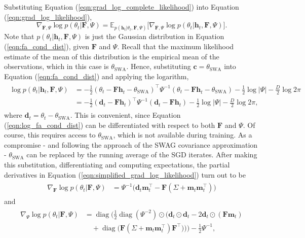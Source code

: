 \documentclass[msc,deptreport.inf]{infthesis} %
\newcommand{\matr}[1]{\mathbf{#1}}
\newcommand{\E}{\mathbb E}
\newcommand{\diag}{\mathop{\mathrm{diag}}}
\begin{document}
Substituting Equation (\ref{eqn:grad_log_complete_likelihood}) into Equation (\ref{eqn:grad_log_likelihood}),
\begin{equation}\label{eqn:simplified_grad_log_likelihood}
	\nabla_{\matr{F}, \Psi} \log p(\theta_t | \matr{F}, \Psi)
	= \E_{p(\matr{h}_t | \theta_t, \matr{F}, \Psi)} \big[ \nabla_{\matr{F}, \Psi} \log p(\theta_t | \matr{h}_t, \matr{F}, \Psi) \big].
\end{equation}
Note that $p(\theta_t | \matr{h}_t, \matr{F}, \Psi)$ is just the Gaussian distribution in Equation (\ref{eqn:fa_cond_dist}), given $\matr{F}$ and $\Psi$. Recall that the maximum likelihood estimate of the mean of this distribution is the empirical mean of the observations, which in this case is $\theta_{\text{SWA}}$. Hence, substituting $\matr{c} = \theta_{\text{SWA}}$ into Equation (\ref{eqn:fa_cond_dist}) and applying the logarithm,
\begin{align}\label{eqn:log_fa_cond_dist}
\begin{split}
	\log p(\theta_t | \matr{h}_t, \matr{F}, \Psi)
	& = -\frac{1}{2} (\theta_t - \matr{Fh}_t - \theta_{\text{SWA}})^\intercal \Psi^{-1} (\theta_t - \matr{Fh}_t - \theta_{\text{SWA}}) - \frac{1}{2} \log |\Psi| - \frac{D}{2} \log 2\pi \\
	& = -\frac{1}{2} (\matr{d}_t - \matr{Fh}_t)^\intercal \Psi^{-1} (\matr{d}_t - \matr{Fh}_t) - \frac{1}{2} \log |\Psi| - \frac{D}{2} \log 2\pi,
\end{split}
\end{align}
where $\matr{d}_t = \theta_t - \theta_{\text{SWA}}$. This is convenient, since Equation (\ref{eqn:log_fa_cond_dist}) can be differentiated with respect to both $\matr{F}$ and $\Psi$. Of course, this requires access to $\theta_{\text{SWA}}$, which is not available during training. As a compromise - and following the approach of the SWAG covariance approximation - $\theta_{\text{SWA}}$ can be replaced by the running average of the SGD iterates. After making this substitution, differentiating and computing expectations, the partial derivatives in Equation (\ref{eqn:simplified_grad_log_likelihood}) turn out to be
\begin{align}\label{eqn:derivatives_wrt_F}
\begin{split}
	\nabla_{\matr{F}} \log p(\theta_t | \matr{F}, \Psi) 
	& = \Psi^{-1} \big(\matr{d}_t \matr{m}_t^\intercal - \matr{F}  (\Sigma + \matr{m}_t \matr{m}_t^\intercal)\big)
\end{split}
\end{align} 
and
\begin{align}
\begin{split}\label{eqn:derivatives_wrt_Psi}
	\nabla_{\Psi} \log p(\theta_t | \matr{F}, \Psi) 
	& = \diag\Bigg(\frac{1}{2} \diag(\Psi^{-2}) \odot \Big(\matr{d}_t \odot \matr{d}_t - 2\matr{d}_t \odot (\matr{F} \matr{m}_t) \\
	& \quad + \diag\big( \matr{F} (\Sigma + \matr{m}_t \matr{m}_t^\intercal) \matr{F}^\intercal \big) \Big) \Bigg)
	 - \frac{1}{2} \Psi^{-1},
\end{split}
\end{align} 
\end{document}
